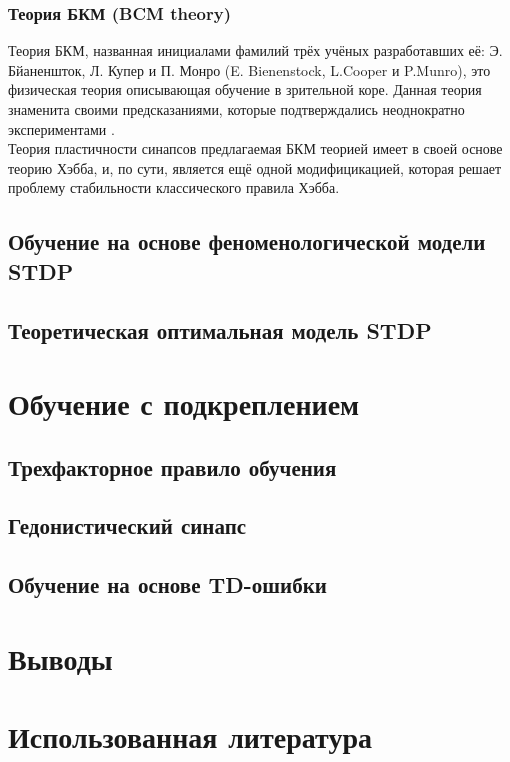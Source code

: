 \documentclass[a4paper,10pt]{article}
\begin{document}
\subsubsection{Теория БКМ (BCM theory)}
\indent Теория БКМ, названная инициалами фамилий трёх учёных разработавших её: Э. Бйаненшток, Л. Купер и П. Монро (E. Bienenstock, L.Cooper и P.Munro), это физическая теория описывающая обучение в зрительной коре. Данная теория знаменита своими предсказаниями, которые подтверждались неоднократно экспериментами \cite{Cooper}.\\
\indent Теория пластичности синапсов предлагаемая БКМ теорией имеет в своей основе теорию Хэбба, и, по сути, является ещё одной модифицикацией, которая решает проблему стабильности классического правила Хэбба.\\


\subsection{Обучение на основе феноменологической модели STDP}
\subsection{Теоретическая оптимальная модель STDP}
\section{Обучение с подкреплением}
\subsection{Трехфакторное правило обучения}
\subsection{Гедонистический синапс}
\subsection{Обучение на основе TD-ошибки}
\section{Выводы}
\section{Использованная литература}
{}

\end{document}
